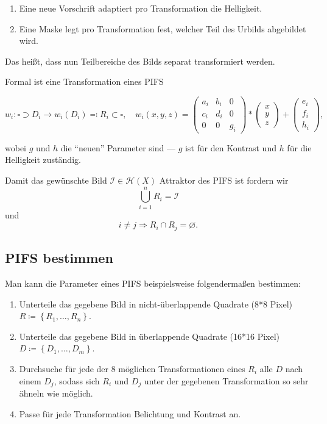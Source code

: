\documentclass[afourpaper]{tufte-handout}
\begin{document}
\begin{enumerate}
  \item Eine neue Vorschrift adaptiert pro Transformation die Helligkeit.
  \item Eine Maske legt pro Transformation fest, welcher Teil des Urbilds abgebildet wird.
\end{enumerate}

Das heißt, dass nun Teilbereiche des Bilds separat transformiert werden.

Formal ist eine Transformation eines PIFS

\begin{equation*}
  w_i: \square \supset D_i \to w_i(D_i) \eqqcolon R_i \subset \square, \quad w_i(x,y,z) = \begin{pmatrix}
    a_i & b_i & 0 \\
    c_i & d_i & 0 \\
    0 & 0 & g_i
  \end{pmatrix} * \begin{pmatrix}
    x \\ y \\ z
  \end{pmatrix} + \begin{pmatrix}
    e_i \\ f_i \\ h_i
  \end{pmatrix}\text{,}
\end{equation*}

wobei \( g \) und \( h \) die ``neuen'' Parameter sind --- \( g \) ist für den Kontrast und \( h \) für die Helligkeit zuständig.

Damit das gewünschte Bild \( \mathcal{I} \in \mathcal{H}(X) \) Attraktor des PIFS ist fordern wir
\begin{equation*}
  \bigcup_{i=1}^n R_i = \mathcal{I}
\end{equation*}
und
\begin{equation*}
  i \neq j \Rightarrow R_i \cap R_j = \varnothing\text{.}
\end{equation*}

\subsection{PIFS bestimmen}

Man kann die Parameter eines PIFS beispielsweise folgendermaßen bestimmen:

\begin{enumerate}
  \item Unterteile das gegebene Bild in nicht-überlappende Quadrate (8*8 Pixel) \( R \coloneqq \left \{ R_1,\dots, R_n \right \} \).
  \item Unterteile das gegebene Bild in überlappende Quadrate (16*16 Pixel) \( D \coloneqq \left \{ D_1, \dots, D_m \right \} \).
  \item Durchsuche für jede der 8 möglichen Transformationen eines \( R_i \) alle \( D \) nach einem \( D_j \), sodass sich \( R_i \) und \( D_j \) unter der gegebenen Transformation so sehr ähneln wie möglich.
  \item Passe für jede Transformation Belichtung und Kontrast an.
\end{enumerate}
\end{document}
